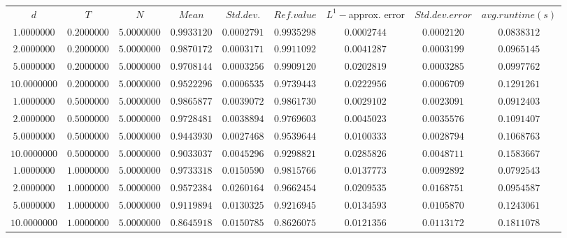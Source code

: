 \begin{tabular}{ccccccccc}
$d$ & $T$ & $N$ & $Mean$ & $Std. dev.$ & $Ref. value$ & $L^1-$approx. error & $Std. dev. error$ & $avg. runtime (s)$\\
$1.0000000$ & $0.2000000$ & $5.0000000$ & $0.9933120$ & $0.0002791$ & $0.9935298$ & $0.0002744$ & $0.0002120$ & $0.0838312$\\
$2.0000000$ & $0.2000000$ & $5.0000000$ & $0.9870172$ & $0.0003171$ & $0.9911092$ & $0.0041287$ & $0.0003199$ & $0.0965145$\\
$5.0000000$ & $0.2000000$ & $5.0000000$ & $0.9708144$ & $0.0003256$ & $0.9909120$ & $0.0202819$ & $0.0003285$ & $0.0997762$\\
$10.0000000$ & $0.2000000$ & $5.0000000$ & $0.9522296$ & $0.0006535$ & $0.9739443$ & $0.0222956$ & $0.0006709$ & $0.1291261$\\
$1.0000000$ & $0.5000000$ & $5.0000000$ & $0.9865877$ & $0.0039072$ & $0.9861730$ & $0.0029102$ & $0.0023091$ & $0.0912403$\\
$2.0000000$ & $0.5000000$ & $5.0000000$ & $0.9728481$ & $0.0038894$ & $0.9769603$ & $0.0045023$ & $0.0035576$ & $0.1091407$\\
$5.0000000$ & $0.5000000$ & $5.0000000$ & $0.9443930$ & $0.0027468$ & $0.9539644$ & $0.0100333$ & $0.0028794$ & $0.1068763$\\
$10.0000000$ & $0.5000000$ & $5.0000000$ & $0.9033037$ & $0.0045296$ & $0.9298821$ & $0.0285826$ & $0.0048711$ & $0.1583667$\\
$1.0000000$ & $1.0000000$ & $5.0000000$ & $0.9733318$ & $0.0150590$ & $0.9815766$ & $0.0137773$ & $0.0092892$ & $0.0792543$\\
$2.0000000$ & $1.0000000$ & $5.0000000$ & $0.9572384$ & $0.0260164$ & $0.9662454$ & $0.0209535$ & $0.0168751$ & $0.0954587$\\
$5.0000000$ & $1.0000000$ & $5.0000000$ & $0.9119894$ & $0.0130325$ & $0.9216945$ & $0.0134593$ & $0.0105870$ & $0.1243061$\\
$10.0000000$ & $1.0000000$ & $5.0000000$ & $0.8645918$ & $0.0150785$ & $0.8626075$ & $0.0121356$ & $0.0113172$ & $0.1811078$\\
\end{tabular}
